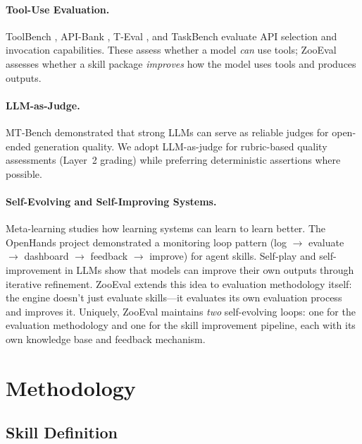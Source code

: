 \documentclass[11pt,a4paper]{article}
\begin{document}
\paragraph{Tool-Use Evaluation.}
ToolBench \citep{qin2023toolllm}, API-Bank \citep{li2023apibank}, T-Eval \citep{chen2023teval}, and TaskBench \citep{shen2023taskbench} evaluate API selection and invocation capabilities. These assess whether a model \emph{can} use tools; ZooEval assesses whether a skill package \emph{improves} how the model uses tools and produces outputs.

\paragraph{LLM-as-Judge.}
MT-Bench \citep{zheng2023judging} demonstrated that strong LLMs can serve as reliable judges for open-ended generation quality. We adopt LLM-as-judge for rubric-based quality assessments (Layer~2 grading) while preferring deterministic assertions where possible.

\paragraph{Self-Evolving and Self-Improving Systems.}
Meta-learning \citep{hospedales2022metalearning} studies how learning systems can learn to learn better. The OpenHands project demonstrated a monitoring loop pattern (log $\rightarrow$ evaluate $\rightarrow$ dashboard $\rightarrow$ feedback $\rightarrow$ improve) for agent skills. Self-play and self-improvement in LLMs \citep{huang2023selfimprove} show that models can improve their own outputs through iterative refinement. ZooEval extends this idea to evaluation methodology itself: the engine doesn't just evaluate skills---it evaluates its own evaluation process and improves it. Uniquely, ZooEval maintains \emph{two} self-evolving loops: one for the evaluation methodology and one for the skill improvement pipeline, each with its own knowledge base and feedback mechanism.

\section{Methodology}
\label{sec:method}

\subsection{Skill Definition}
\end{document}
